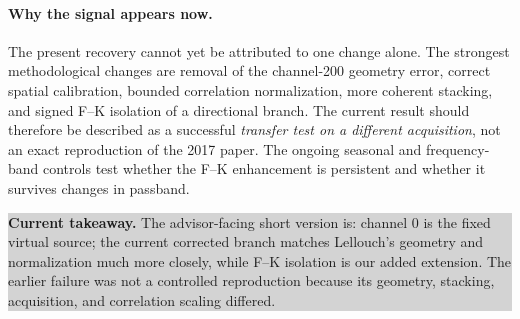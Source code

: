 \documentclass[11pt]{article}
\newcommand{\takeaway}[1]{\par\smallskip\noindent\colorbox{lightgray}{\parbox{0.95\linewidth}{\textbf{Current takeaway.} #1}}\par\medskip}
\begin{document}
\paragraph{Why the signal appears now.} The present recovery cannot yet be attributed to one change alone. The strongest methodological changes are removal of the channel-200 geometry error, correct spatial calibration, bounded correlation normalization, more coherent stacking, and signed F--K isolation of a directional branch. The current result should therefore be described as a successful \emph{transfer test on a different acquisition}, not an exact reproduction of the 2017 paper. The ongoing seasonal and frequency-band controls test whether the F--K enhancement is persistent and whether it survives changes in passband.

\takeaway{The advisor-facing short version is: channel 0 is the fixed virtual source; the current corrected branch matches Lellouch's geometry and normalization much more closely, while F--K isolation is our added extension. The earlier failure was not a controlled reproduction because its geometry, stacking, acquisition, and correlation scaling differed.}
\end{document}
